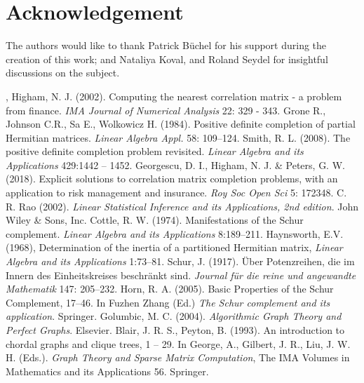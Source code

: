 \documentclass[11pt, a4paper]{article}
\begin{document}
\section*{Acknowledgement}
The authors would like to thank Patrick B\"uchel for his support during the creation of this work; and Nataliya Koval, and Roland Seydel for insightful discussions on the subject. 

\begin{thebibliography}{MM}
	, Higham, N. J. (2002). Computing the nearest correlation matrix - a problem from finance. \textit{IMA Journal of Numerical Analysis} 22: 329 - 343.
	 Grone R., Johnson C.R., Sa E., Wolkowicz H. (1984). Positive definite completion of partial Hermitian matrices. \textit{Linear Algebra Appl.} 58: 109--124.
	 Smith, R. L. (2008). The positive definite completion problem revisited. \textit{Linear Algebra and its Applications} 429:1442 -- 1452.	
     Georgescu, D. I., Higham, N. J. \& Peters, G. W. (2018). Explicit solutions to correlation matrix completion problems, with an application to risk management and insurance. \textit{Roy Soc Open Sci} 5: 172348.
	 C. R. Rao (2002). \textit{Linear Statistical Inference and its Applications, 2nd edition}. John Wiley \& Sons, Inc.
	 Cottle, R. W. (1974). Manifestations of the Schur complement. \textit{Linear Algebra and its Applications} 8:189--211. 
	 Haynsworth, E.V. (1968), Determination of the inertia of a partitioned Hermitian matrix,  \textit{Linear  Algebra and its Applications} 1:73--81.
	 Schur, J. (1917). \"Uber Potenzreihen, die im Innern des Einheitskreises beschr\"ankt sind. \textit{Journal f\"ur die reine und angewandte Mathematik} 147: 205--232.
	 Horn, R. A. (2005). Basic  Properties  of  the  Schur  Complement, 17--46. In Fuzhen Zhang (Ed.) \textit{The Schur complement and its application}. Springer.
	 Golumbic, M. C. (2004). \textit{Algorithmic Graph Theory and Perfect Graphs}. Elsevier. 
	 Blair, J. R. S., Peyton, B. (1993). An introduction to chordal graphs and clique trees, 1 -- 29. In George, A., Gilbert, J. R., Liu, J. W. H. (Eds.). \textit{Graph Theory and Sparse Matrix Computation}, The IMA Volumes in Mathematics and its Applications 56. Springer.
\end{thebibliography}
\end{document}
